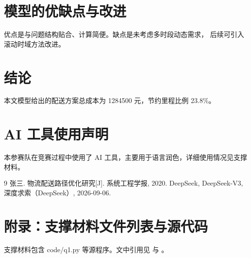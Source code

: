\documentclass[12pt,a4paper]{ctexart}
\begin{document}
\section{模型的优缺点与改进}
优点是与问题结构贴合、计算简便。缺点是未考虑多时段动态需求，
后续可引入滚动时域方法改进。

\section{结论}
本文模型给出的配送方案总成本为 1284500 元，节约里程比例 23.8\%。

\section*{AI 工具使用声明}
本参赛队在竞赛过程中使用了 AI 工具，主要用于语言润色，详细使用情况见支撑材料。

\begin{thebibliography}{9}
 张三. 物流配送路径优化研究[J]. 系统工程学报, 2020.
 DeepSeek, DeepSeek-V3, 深度求索（DeepSeek）, 2026-09-06.
\end{thebibliography}

\appendix
\section{附录：支撑材料文件列表与源代码}
支撑材料包含 code/q1.py 等源程序。文中引用见 \cite{ref1} 与 \cite{ref2}。
\end{document}
